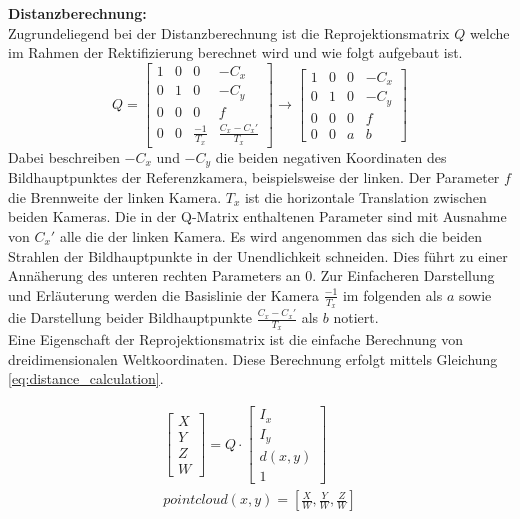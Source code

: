 \noindent
\textbf{Distanzberechnung:}\\
Zugrundeliegend bei der Distanzberechnung ist die Reprojektionsmatrix $Q$ welche im Rahmen der Rektifizierung berechnet wird und wie folgt aufgebaut ist.
\begin{equation}
    Q= 
    \begin{bmatrix}
      1 & 0 & 0 & -C_x\\
      0 & 1 & 0 & -C_y\\
      0 & 0 & 0 & f\\
      0 & 0 & \frac{-1}{T_x} & \frac{C_x - C_x'}{T_x}
    \end{bmatrix}
    \longrightarrow
    \begin{bmatrix}
      1 & 0 & 0 & -C_x\\
      0 & 1 & 0 & -C_y\\
      0 & 0 & 0 & f\\
      0 & 0 & a & b
    \end{bmatrix}
\end{equation}
Dabei beschreiben $-C_x$ und $-C_y$ die beiden negativen Koordinaten des Bildhauptpunktes der Referenzkamera, beispielsweise der linken. Der Parameter $f$ die Brennweite der linken Kamera. $T_x$ ist die horizontale Translation zwischen beiden Kameras. Die in der Q-Matrix enthaltenen Parameter sind mit Ausnahme von $C_x'$ alle die der linken Kamera. Es wird angenommen das sich die beiden Strahlen der Bildhauptpunkte in der Unendlichkeit schneiden. Dies führt zu einer Annäherung des unteren rechten Parameters an $0$. Zur Einfacheren Darstellung und Erläuterung werden die Basislinie der Kamera $\frac{-1}{T_x}$ im folgenden als $a$ sowie die Darstellung beider Bildhauptpunkte $\frac{C_x - C_x'}{T_x}$ als $b$ notiert.\\

\noindent
Eine Eigenschaft der Reprojektionsmatrix ist die einfache Berechnung von dreidimensionalen Weltkoordinaten. Diese Berechnung erfolgt mittels Gleichung \ref{eq:distance_calculation}.

\begin{equation}\label{eq:distance_calculation}
    \begin{aligned}
        \begin{bmatrix}
            X\\ Y \\ Z\\ W
        \end{bmatrix}
        = Q \cdot 
        \begin{bmatrix}
            I_x\\ I_y \\ d(x,y)\\ 1
        \end{bmatrix}\\
        pointcloud(x,y) = [\frac{X}{W}, \frac{Y}{W}, \frac{Z}{W} ]
    \end{aligned}
\end{equation}


